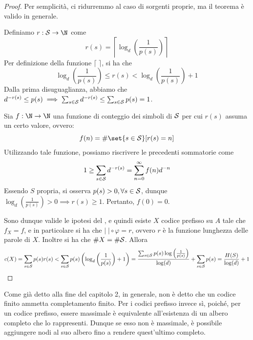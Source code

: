 \begin{proof}
  Per semplicità, ci ridurremmo al caso di sorgenti proprie, ma il teorema è valido in generale.
  
  Definiamo \(r: \SCal \to \N\) come
  \[r(s) = \left\lceil \log_d\left(\frac{1}{p(s)}\right) \right\rceil\]
  Per definizione della funzione \(\lceil\;\rceil\), si ha che
  \[\log_d\left(\frac{1}{p(s)}\right) \leq r(s) < \log_d\left(\frac{1}{p(s)}\right) + 1\]
  Dalla prima disuguaglianza, abbiamo che \(d^{-r(s)} \leq p(s)\implies \sum_{s\in\mathcal{S}} d^{-r(s)} \leq \sum_{s\in\mathcal{S}} p(s) = 1\).

  Sia \(f: \N \to \N\) una funzione di conteggio dei simboli di \(\mathcal{S}\) per cui \(r(s)\) assuma un certo valore, ovvero:
  \[f(n) = \#\set{s \in \SCal}[r(s) = n]\]
  Utilizzando tale funzione, possiamo riscrivere le precedenti sommatorie come
  \[1 \geq \sum_{s\in\mathcal{S}} d^{-r(s)} = \sum_{n=0}^{\infty} f(n)d^{-n}\]
  Essendo \(S\) propria, si osserva \(p(s) > 0,  \forall s \in \mathcal{S}\), dunque \(\log_d\left(\frac{1}{p(s)}\right)>0 \implies r(s) \geq 1\).
  Pertanto, \(f(0) = 0\). 
  
  Sono dunque valide le ipotesi del , e quindi esiste \(X\) codice prefisso su \(A\) tale che \(f_X = f\), e in particolare si ha che \(\lvert\; \rvert \circ \varphi = r\), ovvero $r$ è la funzione lunghezza delle parole di \(X\).
  Inoltre si ha che \(\# X = \# \mathcal{S}\). Allora
  \[c(X) = \sum_{s\in\mathcal{S}} p(s)r(s) < \sum_{s\in\mathcal{S}} p(s)\left(\log_d\left(\frac{1}{p(s)}\right) + 1\right) = \frac{\sum_{s\in\mathcal{S}} p(s)\log\left(\frac{1}{p(s)}\right)}{\log(d)} + \sum_{s\in\mathcal{S}} p(s) = \frac{H(S)}{\log(d)} + 1\]
\end{proof}

\begin{observation}{}
  Come già detto alla fine del capitolo 2, in generale, non è detto che un codice finito ammetta completamento finito.
  Per i codici prefisso invece sì, poiché, per un codice prefisso, essere massimale è equivalente all'esistenza di un albero completo che lo rappresenti.
  Dunque se esso non è massimale, è possibile  aggiungere nodi al suo albero fino a rendere quest'ultimo completo.
\end{observation}

